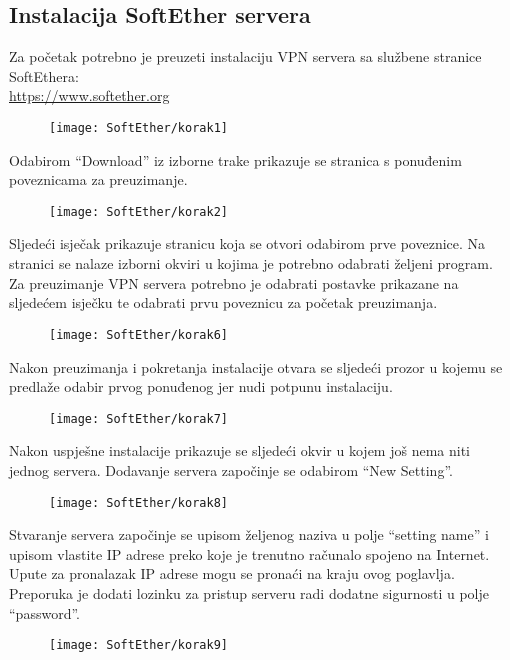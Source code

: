 \subsection*{Instalacija SoftEther servera}
\hspace{0.5cm}
Za početak potrebno je preuzeti instalaciju VPN servera sa službene stranice SoftEthera:\\ \url{https://www.softether.org}
\begin{figure}[h!]
	\centering
     \texttt{[image: SoftEther/korak1]}
\end{figure}
\FloatBarrier
Odabirom ``Download'' iz izborne trake prikazuje se stranica s ponuđenim poveznicama za preuzimanje.
\begin{figure}[h!]
     \centering
     \texttt{[image: SoftEther/korak2]}
\end{figure}
\FloatBarrier
Sljedeći isječak prikazuje stranicu koja se otvori odabirom prve poveznice. Na stranici se nalaze izborni okviri u kojima je potrebno odabrati željeni program. Za preuzimanje VPN servera potrebno je odabrati postavke prikazane na sljedećem isječku te odabrati prvu poveznicu za početak preuzimanja.
\begin{figure}[h!]
     \centering
     \texttt{[image: SoftEther/korak6]}
\end{figure}
\FloatBarrier
Nakon preuzimanja i pokretanja instalacije otvara se sljedeći prozor u kojemu se predlaže odabir prvog ponuđenog jer nudi potpunu instalaciju.
\begin{figure}[h!]
     \centering
     \texttt{[image: SoftEther/korak7]}
\end{figure}
\FloatBarrier
Nakon uspješne instalacije prikazuje se sljedeći okvir u kojem još nema niti jednog servera. Dodavanje servera započinje se odabirom ``New Setting''.
\begin{figure}[h!]
     \centering
     \texttt{[image: SoftEther/korak8]}
\end{figure}
\FloatBarrier
Stvaranje servera započinje se upisom željenog naziva u polje ``setting name'' i upisom vlastite IP adrese preko koje je trenutno računalo spojeno na Internet. Upute za pronalazak IP adrese mogu se pronaći na kraju ovog poglavlja. Preporuka je dodati lozinku za pristup serveru radi dodatne sigurnosti u polje ``password''.
\begin{figure}[h!]
     \centering
     \texttt{[image: SoftEther/korak9]}
\end{figure}
